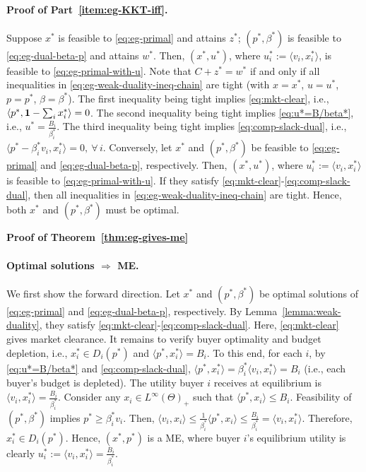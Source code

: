 	\paragraph{Proof of Part~\ref{item:eg-KKT-iff}.} 
	Suppose $x^*$ is feasible to \eqref{eq:eg-primal} and attains $z^*$; $(p^*, \beta^*)$ is feasible to \eqref{eq:eg-dual-beta-p} and attains $w^*$. 
	Then, $(x^*, u^*)$, where $u^*_i := \langle v_i, x^*_i \rangle$, is feasible to \eqref{eq:eg-primal-with-u}. Note that $C + z^* = w^*$ if and only if all inequalities in \eqref{eq:eg-weak-duality-ineq-chain} are tight (with $x = x^*$, $u = u^*$, $p = p^*$, $\beta = \beta^*$). The first inequality being tight implies \eqref{eq:mkt-clear}, i.e., 
	$ \left\langle p^*, \mathbf{1} - \sum_i x^*_i \right \rangle = 0$.
	The second inequality being tight implies \eqref{eq:u*=B/beta*}, i.e.,
	$ u^* = \frac{B_i}{\beta^*_i}$.
	The third inequality being tight implies \eqref{eq:comp-slack-dual}, i.e.,
	$ \langle p^* - \beta^*_i v_i, x^*_i \rangle = 0,\ \forall\, i$. 
	Conversely, let $x^*$ and $(p^*, \beta^*)$ be feasible to \eqref{eq:eg-primal} and \eqref{eq:eg-dual-beta-p}, respectively. Then, $(x^*, u^*)$, where $u^*_i := \langle v_i, x^*_i \rangle$ is feasible to \eqref{eq:eg-primal-with-u}. 
	If they satisfy \eqref{eq:mkt-clear}-\eqref{eq:comp-slack-dual}, then all inequalities in \eqref{eq:eg-weak-duality-ineq-chain} are tight. 
	Hence, both $x^*$ and $(p^*, \beta^*)$ must be optimal.

	\smallskip\noindent\textbf{Proof of Theorem~\ref{thm:eg-gives-me}}
	\paragraph{Optimal solutions $\Rightarrow$ ME.}
	We first show the forward direction. Let $x^*$ and $(p^*, \beta^*)$ be optimal solutions of \eqref{eq:eg-primal} and \eqref{eq:eg-dual-beta-p}, respectively. By Lemma~\ref{lemma:weak-duality}, they satisfy \eqref{eq:mkt-clear}-\eqref{eq:comp-slack-dual}.
	Here, \eqref{eq:mkt-clear} gives market clearance. 
	It remains to verify buyer optimality and budget depletion, i.e., $x^*_i \in D_i(p^*)$ and $\langle p^*, x^*_i \rangle = B_i$. 
	To this end, for each $i$, by \eqref{eq:u*=B/beta*} and \eqref{eq:comp-slack-dual},
		$\langle p^*, x^*_i\rangle  = \beta^*_i \langle v_i, x^*_i\rangle = B_i$ (i.e., each buyer's budget is depleted). The utility buyer $i$ receives at equilibrium is
	 $\langle v_i, x^*_i\rangle = \frac{B_i}{\beta^*_i}$. 
	Consider any $x_i\in L^\infty(\Theta)_+$ such that $\langle p^*, x_i \rangle \leq B_i$. Feasibility of $(p^*, \beta^*)$ implies $p^* \geq \beta^*_i v_i$. Then,
	$ \langle v_i, x_i\rangle \leq \frac{1}{\beta^*_i} \langle p^*, x_i \rangle \leq \frac{B_i}{\beta^*_i} = \langle v_i, x^*_i \rangle$.
	Therefore, 
	$x^*_i \in D_i(p^*)$.
	Hence, $(x^*, p^*)$ is a ME, where buyer $i$'s equilibrium utility is clearly $u^*_i := \langle v_i, x^*_i \rangle = \frac{B_i}{\beta^*_i}$.
	
